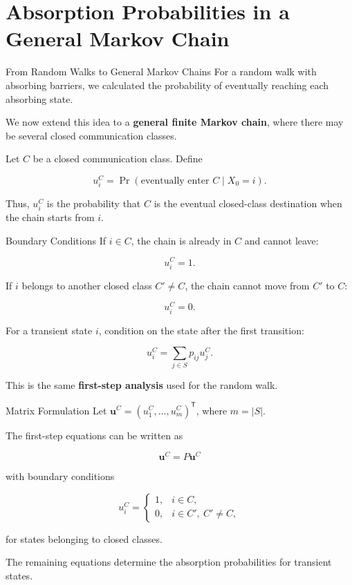 \documentclass[
  ignorenonframetext,
  aspectratio=169,
]{beamer}
\begin{document}
\section{Absorption Probabilities in a General Markov
Chain}\label{absorption-probabilities-in-a-general-markov-chain}

\begin{frame}{From Random Walks to General Markov Chains}
\protect{}\label{from-random-walks-to-general-markov-chains}
For a random walk with absorbing barriers, we calculated the probability
of eventually reaching each absorbing state.

We now extend this idea to a \textbf{general finite Markov chain}, where
there may be several closed communication classes.

Let \(C\) be a closed communication class. Define

\[
u_i^C=\Pr(\text{eventually enter }C\mid X_0=i).
\]

Thus, \(u_i^C\) is the probability that \(C\) is the eventual
closed-class destination when the chain starts from \(i\).
\end{frame}

\begin{frame}{Boundary Conditions}
\protect{}\label{boundary-conditions}
If \(i\in C\), the chain is already in \(C\) and cannot leave:

\[
u_i^C=1.
\]

If \(i\) belongs to another closed class \(C'\neq C\), the chain cannot
move from \(C'\) to \(C\):

\[
u_i^C=0.
\]

For a transient state \(i\), condition on the state after the first
transition:

\[
u_i^C=\sum_{j\in S}p_{ij}u_j^C.
\]

This is the same \textbf{first-step analysis} used for the random walk.
\end{frame}

\begin{frame}{Matrix Formulation}
\protect{}\label{matrix-formulation}
Let \(\mathbf{u}^C=(u_1^C,\ldots,u_m^C)^\mathsf{T}\), where \(m=|S|\).

The first-step equations can be written as

\[
\boxed{\mathbf{u}^C=P\mathbf{u}^C}
\]

with boundary conditions

\[
u_i^C=
\begin{cases}
1, & i\in C,\\
0, & i\in C',\ C'\neq C,
\end{cases}
\]

for states belonging to closed classes.

The remaining equations determine the absorption probabilities for
transient states.
\end{frame}
\end{document}
